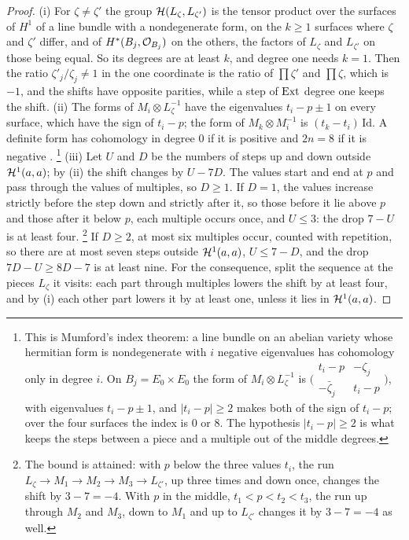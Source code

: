 \begin{proof}
(i) For $\zeta\ne\zeta'$ the group $\mathcal{H}(L_{\zeta},L_{\zeta'})$ is the tensor
product over the surfaces of $H^{1}$ of a line bundle with a nondegenerate
form, on the $k\ge1$ surfaces where $\zeta$ and $\zeta'$ differ, and of
$H^{*}(B_{j},\mathcal{O}_{B_{j}})$ on the others, the factors of $L_{\zeta}$ and
$L_{\zeta'}$ on those being equal. So its degrees are at least $k$, and degree
one needs $k=1$. Then the ratio $\zeta'_{j}/\zeta_{j}\ne1$ in the one
coordinate is the ratio of $\prod\zeta'$ and $\prod\zeta$, which is $-1$, and
the shifts have opposite parities, while a step of $\operatorname{Ext}$ degree one keeps
the shift. (ii) The forms of $M_{i}\otimes L_{\zeta}^{-1}$ have the
eigenvalues $t_{i}-p\pm1$ on every surface, which have the sign of $t_{i}-p$;
the form of $M_{k}\otimes M_{i}^{-1}$ is $(t_{k}-t_{i})\,\mathrm{Id}$. A
definite form has cohomology in degree $0$ if it is positive and $2n=8$ if
it is negative \cite[Chapter~3]{BL04}.%
\footnote{This is Mumford's index theorem: a line bundle on an abelian
variety whose hermitian form is nondegenerate with $i$ negative eigenvalues
has cohomology only in degree $i$. On $B_{j}=E_{0}\times E_{0}$ the form of
$M_{i}\otimes L_{\zeta}^{-1}$ is
$\bigl(\begin{smallmatrix}t_{i}-p&-\zeta_{j}\\-\bar\zeta_{j}&t_{i}-p\end{smallmatrix}\bigr)$,
with eigenvalues $t_{i}-p\pm1$, and $|t_{i}-p|\ge2$ makes both of the sign of
$t_{i}-p$; over the four surfaces the index is $0$ or $8$. The hypothesis
$|t_{i}-p|\ge2$ is what keeps the steps between a piece and a multiple out
of the middle degrees.}
(iii) Let $U$ and $D$ be the numbers of steps up and down outside
$\mathcal{H}^{1}(a,a)$; by (ii) the shift changes by $U-7D$. The values start and
end at $p$ and pass through the values of multiples, so $D\ge1$. If $D=1$,
the values increase strictly before the step down and strictly after it, so
those before it lie above $p$ and those after it below $p$, each multiple
occurs once, and $U\le3$: the drop $7-U$ is at least four.%
\footnote{The bound is attained: with $p$ below the three values $t_{i}$, the
run $L_{\zeta}\to M_{1}\to M_{2}\to M_{3}\to L_{\zeta'}$, up three times and
down once, changes the shift by $3-7=-4$. With $p$ in the middle,
$t_{1}<p<t_{2}<t_{3}$, the run up through $M_{2}$ and $M_{3}$, down to $M_{1}$
and up to $L_{\zeta'}$ changes it by $3-7=-4$ as well.} If $D\ge2$, at most
six multiples occur, counted with repetition, so there are at most seven
steps outside $\mathcal{H}^{1}(a,a)$, $U\le7-D$, and the drop $7D-U\ge8D-7$ is at
least nine. For the consequence, split the sequence at the pieces
$L_{\zeta}$ it visits: each part through multiples lowers the shift by at
least four, and by (i) each other part lowers it by at least one, unless it
lies in $\mathcal{H}^{1}(a,a)$.
\end{proof}

